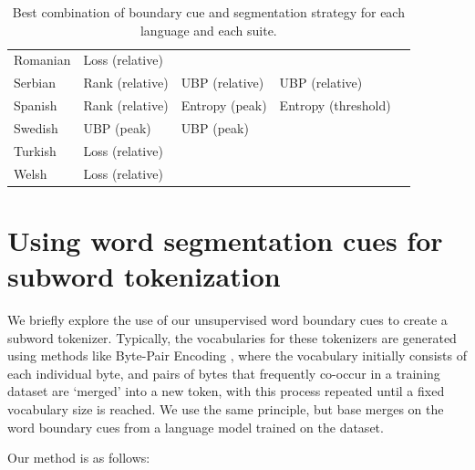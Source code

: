 \begin{table}[t]
\begin{tabular}{lllll}
    Romanian & Loss (relative) &  &  &  \\
    Serbian & Rank (relative) & UBP (relative) & UBP (relative) &  \\
    Spanish & Rank (relative) & Entropy (peak) & Entropy (threshold) &  \\
    Swedish & UBP (peak) & UBP (peak) &  &  \\
    Turkish & Loss (relative) &  &  &  \\
    Welsh & Loss (relative) &  &  &  \\
    \bottomrule
    \end{tabular}
    \caption{Best combination of boundary cue and segmentation strategy for each language and each suite.}
    \label{tab:15-bestcuesfull}
\end{table}

\section{Using word segmentation cues for subword tokenization}\label{app:15-tokenizers}

We briefly explore the use of our unsupervised word boundary cues to create a subword tokenizer. Typically, the vocabularies for these tokenizers are generated using methods like Byte-Pair Encoding \citep{sennrich-etal-2016-bpe}, where the vocabulary initially consists of each individual byte, and pairs of bytes that frequently co-occur in a training dataset are `merged' into a new token, with this process repeated until a fixed vocabulary size is reached. We use the same principle, but base merges on the word boundary cues from a language model trained on the dataset.

Our method is as follows:

